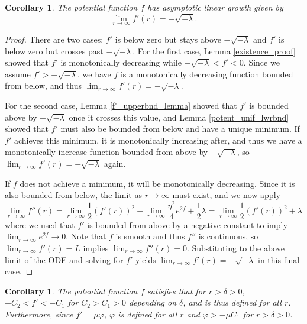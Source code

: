 \documentclass[12pt, a4paper, reqno, oneside]{amsart}
\numberwithin{equation}{section}
\theoremstyle{plain}
\newtheorem{corollary}[theorem]{Corollary}
\theoremstyle{definition}
\theoremstyle{plain}
\begin{document}
\begin{corollary}\label{potent_asympt_growth}
  The potential function $f$ has asymptotic linear growth given by
  \[
    \lim_{r\to\infty}f'(r) = -\sqrt{-\lambda}.
  \]
\end{corollary}
\begin{proof}
  There are two cases: $f'$ is below zero but stays above $-\sqrt{-\lambda}$ and $f'$ is below zero but crosses past $-\sqrt{-\lambda}$. For the first case, Lemma \ref{existence_proof} showed that $f'$ is monotonically decreasing while $-\sqrt{-\lambda}<f'<0$. Since we assume $f'>-\sqrt{-\lambda}$, we have $f$ is a monotonically decreasing function bounded from below, and thus $\lim_{r\to\infty} f'(r)=-\sqrt{-\lambda}$.

  For the second case, Lemma \ref{f'_upperbnd_lemma} showed that $f'$ is bounded above by $-\sqrt{-\lambda}$ once it crosses this value, and Lemma \ref{potent_unif_lwrbnd} showed that $f'$ must also be bounded from below and have a unique minimum. If $f'$ achieves this minimum, it is monotonically increasing after, and thus we have a monotonically increase function bounded from above by $-\sqrt{-\lambda}$, so $\lim_{r\to\infty} f'(r) = -\sqrt{-\lambda}$ again.

  If $f$ does not achieve a minimum, it will be monotonically decreasing. Since it is also bounded from below, the limit as $r\to\infty$ must exist, and we now apply
  \[
    \lim_{r\to\infty} f''(r) = \lim_{r\to\infty}\frac{1}{2}(f'(r))^{2}-\lim_{r\to\infty}\frac{\eta^{2}}{4}e^{2f}+\frac{1}{2}\lambda=\lim_{r\to\infty}\frac{1}{2}(f'(r))^{2}+\lambda
  \]
  where we used that $f'$ is bounded from above by a negative constant to imply $\lim_{r\to\infty}e^{2f}\to 0$. Note that $f$ is smooth and thus $f''$ is continuous, so $\lim_{r\to\infty}f'(r)=L$ implies $\lim_{r\to\infty}f''(r)=0$. Substituting to the above limit of the ODE and solving for $f'$ yields $\lim_{r\to\infty}f'(r)=-\sqrt{-\lambda}$ in this final case.
\end{proof}

\begin{corollary}\label{COR_unif_bounds}
  The potential function $f$ satisfies that for $r>\delta>0$, $-C_2<f'<-C_1$ for $C_2>C_1>0$ depending on $\delta$, and is thus defined for all $r$. Furthermore, since $f'=\mu\varphi$, $\varphi$ is defined for all $r$ and $\varphi>-\mu C_1$ for $r>\delta>0$.
\end{corollary}
\end{document}
